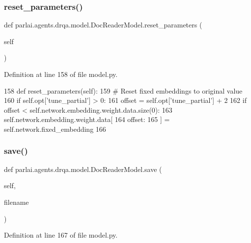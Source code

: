 \subsubsection{\texorpdfstring{reset\+\_\+parameters()}{reset\_parameters()}}
{\footnotesize\ttfamily def parlai.\+agents.\+drqa.\+model.\+Doc\+Reader\+Model.\+reset\+\_\+parameters (\begin{DoxyParamCaption}\item[{}]{self }\end{DoxyParamCaption})}



Definition at line 158 of file model.\+py.


\begin{DoxyCode}
158     \textcolor{keyword}{def }reset\_parameters(self):
159         \textcolor{comment}{# Reset fixed embeddings to original value}
160         \textcolor{keywordflow}{if} self.opt[\textcolor{stringliteral}{'tune\_partial'}] > 0:
161             offset = self.opt[\textcolor{stringliteral}{'tune\_partial'}] + 2
162             \textcolor{keywordflow}{if} offset < self.network.embedding.weight.data.size(0):
163                 self.network.embedding.weight.data[
164                     offset:
165                 ] = self.network.fixed\_embedding
166 
\end{DoxyCode}
\mbox{\label{classparlai_1_1agents_1_1drqa_1_1model_1_1DocReaderModel_af50a0adfb1e85342655305813c814f86}} 
\subsubsection{\texorpdfstring{save()}{save()}}
{\footnotesize\ttfamily def parlai.\+agents.\+drqa.\+model.\+Doc\+Reader\+Model.\+save (\begin{DoxyParamCaption}\item[{}]{self,  }\item[{}]{filename }\end{DoxyParamCaption})}



Definition at line 167 of file model.\+py.



